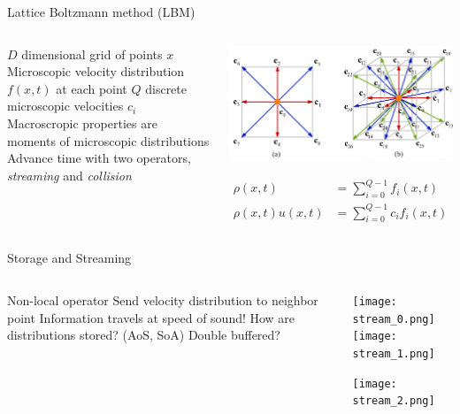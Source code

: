 \placelogofalse
\begin{frame}{Lattice Boltzmann method (LBM)}
\begin{columns}
\begin{outline}
\1 $D$ dimensional grid of points $x$
\1 Microscopic velocity distribution $f(x, t)$ at each point
\1 $Q$ discrete microscopic velocities $c_i$
\1 Macroscropic properties are moments of microscopic distributions
\1 Advance time with two operators, 
\textit{streaming} and \textit{collision}
\end{outline}

\centering
\begin{center}
  \includegraphics[width=0.9\linewidth]{lattice_figure.png}

  \begin{align*}
  \rho(x, t) &= \sum_{i = 0}^{Q - 1} f_i(x, t) \\
  \rho(x,t)u(x,t) &= \sum_{i = 0}^{Q - 1}c_i f_i(x, t)
  \end{align*}
\end{center}
\end{columns}
\end{frame}
\placelogotrue

\begin{frame}{Storage and Streaming}
\begin{columns}
\begin{outline}
\1 Non-local operator
\1 Send velocity distribution to neighbor point
\1 Information travels at speed of sound!
\1 How are distributions stored? (AoS, SoA)
\1 Double buffered?
\end{outline}

\centering
  \begin{center}
    \texttt{[image: stream\_0.png]}
    \texttt{[image: stream\_1.png]}

    \texttt{[image: stream\_2.png]}
  \end{center}
\end{columns}
\end{frame}


